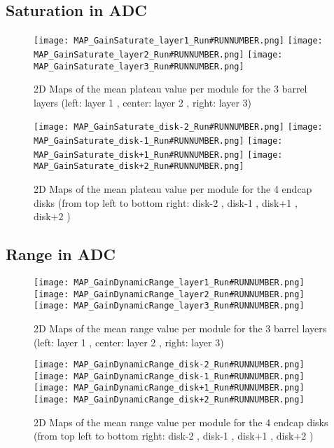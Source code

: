 \documentclass[a4paper,10pt]{article}
\begin{document}
\pagebreak




\subsection{Saturation in ADC}

\begin{figure}[htp]
 \centering
\subfigure
 {\texttt{[image: MAP\_GainSaturate\_layer1\_Run\#RUNNUMBER.png]}}
\subfigure
 {\texttt{[image: MAP\_GainSaturate\_layer2\_Run\#RUNNUMBER.png]}}
\subfigure
 {\texttt{[image: MAP\_GainSaturate\_layer3\_Run\#RUNNUMBER.png]}}
\caption{2D Maps of the mean plateau value per module for the 3 barrel layers (left: layer 1 , center: layer 2 , right: layer 3)}
\end{figure}

\begin{figure}[htp]
 \centering
\subfigure
 {\texttt{[image: MAP\_GainSaturate\_disk-2\_Run\#RUNNUMBER.png]}}
\subfigure
 {\texttt{[image: MAP\_GainSaturate\_disk-1\_Run\#RUNNUMBER.png]}}
\subfigure
 {\texttt{[image: MAP\_GainSaturate\_disk+1\_Run\#RUNNUMBER.png]}}
\subfigure
 {\texttt{[image: MAP\_GainSaturate\_disk+2\_Run\#RUNNUMBER.png]}}
\caption{2D Maps of the mean plateau value per module for the 4 endcap disks (from top left to bottom right: disk-2 , disk-1 , disk+1 , disk+2 )}
\end{figure}


\pagebreak




\subsection{Range in ADC}

\begin{figure}[htp]
 \centering
\subfigure
 {\texttt{[image: MAP\_GainDynamicRange\_layer1\_Run\#RUNNUMBER.png]}}
\subfigure
 {\texttt{[image: MAP\_GainDynamicRange\_layer2\_Run\#RUNNUMBER.png]}}
\subfigure
 {\texttt{[image: MAP\_GainDynamicRange\_layer3\_Run\#RUNNUMBER.png]}}
\caption{2D Maps of the mean range value per module for the 3 barrel layers (left: layer 1 , center: layer 2 , right: layer 3)}
\end{figure}

\begin{figure}[htp]
 \centering
\subfigure
 {\texttt{[image: MAP\_GainDynamicRange\_disk-2\_Run\#RUNNUMBER.png]}}
\subfigure
 {\texttt{[image: MAP\_GainDynamicRange\_disk-1\_Run\#RUNNUMBER.png]}}
\subfigure
 {\texttt{[image: MAP\_GainDynamicRange\_disk+1\_Run\#RUNNUMBER.png]}}
\subfigure
 {\texttt{[image: MAP\_GainDynamicRange\_disk+2\_Run\#RUNNUMBER.png]}}
\caption{2D Maps of the mean range value per module for the 4 endcap disks (from top left to bottom right: disk-2 , disk-1 , disk+1 , disk+2 )}
\end{figure}
\end{document}
